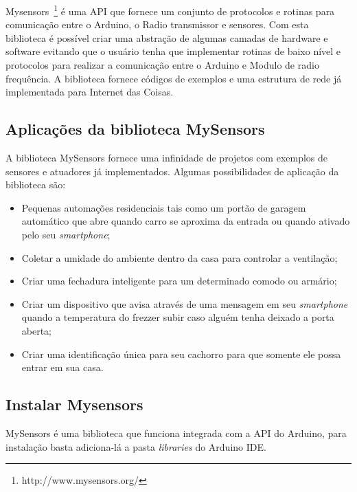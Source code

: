 Mysensors~\footnote{http://www.mysensors.org/} é uma API que fornece um conjunto de protocolos e rotinas para comunicação entre o Arduino, o Radio transmissor e sensores. 
Com esta biblioteca é possível criar uma abstração de algumas camadas de hardware e software evitando que o usuário tenha que implementar rotinas de baixo nível e protocolos para realizar a comunicação entre o Arduino e Modulo de radio frequência. A biblioteca fornece códigos de exemplos e uma estrutura de rede já implementada para Internet das Coisas. 

\subsection{Aplicações da biblioteca MySensors}

A biblioteca MySensors fornece uma infinidade de projetos com exemplos de sensores e atuadores já implementados. Algumas possibilidades de aplicação da biblioteca são:

\begin{itemize}
    \item Pequenas automações residenciais tais como um portão de garagem automático que abre quando carro se aproxima da entrada ou quando ativado pelo seu \textit{smartphone}; 

    \item Coletar a umidade do ambiente dentro da casa para controlar a ventilação;

    \item Criar uma fechadura inteligente para um determinado comodo ou armário; 
    
    \item Criar um dispositivo que avisa através de uma mensagem em seu \textit{smartphone} quando a temperatura do frezzer subir caso alguém tenha deixado a porta aberta;

    \item Criar uma identificação única para seu cachorro para que somente ele possa entrar em sua casa.
\end{itemize}

\subsection{Instalar Mysensors}

MySensors é uma biblioteca que funciona integrada com a API do Arduino, para instalação basta adiciona-lá a pasta \textit{libraries} do Arduino IDE.




